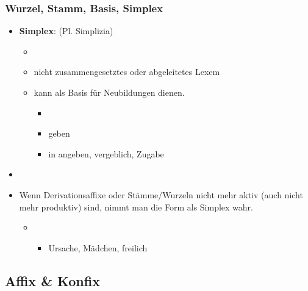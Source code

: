 \begin{frame}
\frametitle{Wurzel, Stamm, Basis, Simplex}

\begin{itemize}
	\item \textbf{Simplex}: (Pl. Simplizia)
	
	\begin{itemize}
		\item[]
		\item nicht zusammengesetztes oder abgeleitetes Lexem
		\item kann als Basis für Neubildungen dienen.
		
		\begin{itemize}
			\item[]
			\item geben
			\item in angeben, vergeblich, Zugabe
		\end{itemize}
		
	\end{itemize}
		
		\item[]
		\item Wenn Derivationsaffixe oder Stämme/Wurzeln nicht mehr aktiv (auch nicht mehr produktiv) sind, nimmt man die Form als Simplex wahr.
		
	\begin{itemize}
		\item[]
		\begin{itemize}
			\item Ursache, Mädchen, freilich
		\end{itemize}
	\end{itemize}
\end{itemize}


\end{frame}


\subsection{Affix \& Konfix}


